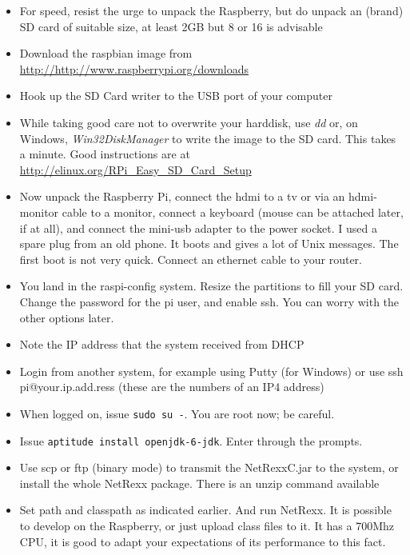 \begin{itemize}
\item For speed, resist the urge to unpack the Raspberry, but do unpack an (brand) SD card of suitable size, at least 2GB but 8 or 16 is advisable
\item Download the raspbian image from \url{http://http://www.raspberrypi.org/downloads} 
\item Hook up the SD Card writer to the USB port of your computer
\item While taking good care not to overwrite your harddisk, use \emph{dd} or, on Windows, \emph{Win32DiskManager} to write the image to the SD card. This takes a minute. Good instructions are at \url{http://elinux.org/RPi_Easy_SD_Card_Setup}
\item Now unpack the Raspberry Pi, connect the hdmi to a tv or via an hdmi-monitor cable to a monitor, connect a keyboard (mouse can be attached later, if at all), and connect the mini-usb adapter to the power socket. I used a spare plug from an old phone. It boots and gives a lot of Unix messages. The first boot is not very quick. Connect an ethernet cable to your router.
\item You land in the raspi-config system. Resize the partitions to fill your SD card. Change the password for the pi user, and enable ssh. You can worry with the other options later.
\item Note the IP address that the system received from DHCP
\item Login from another system, for example using Putty (for Windows) or use ssh pi@your.ip.add.ress (these are the numbers of an IP4 address)
\item When logged on, issue \texttt{sudo su -}. You are root now; be careful.
\item Issue \texttt{aptitude install openjdk-6-jdk}. Enter through the prompts.
\item Use scp or ftp (binary mode) to transmit the NetRexxC.jar to the system, or install the whole NetRexx package. There is an unzip command available
\item Set path and classpath as indicated earlier. And run NetRexx. It is possible to develop on the Raspberry, or just upload class files to it. It has a 700Mhz CPU, it is good to adapt your expectations of its performance to this fact.
\end{itemize}